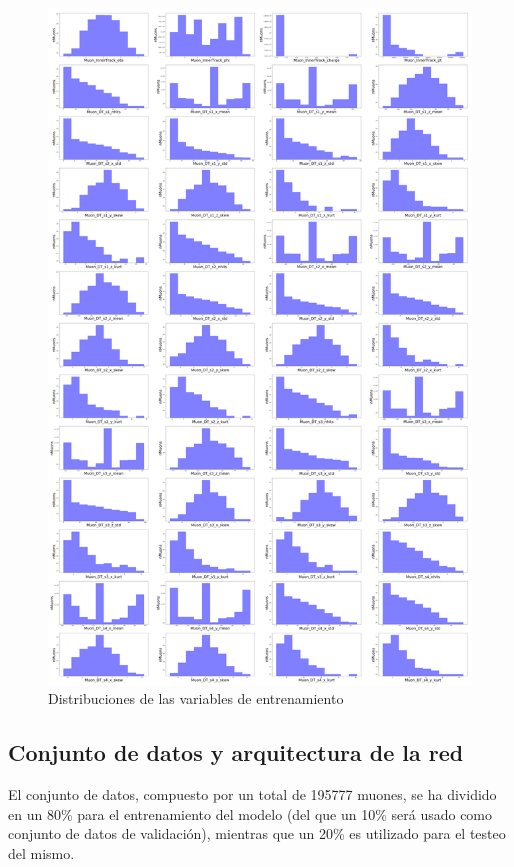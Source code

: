 \begin{figure}
\centering
\includegraphics[width=1.0\textwidth]{figures/Training_vars_2.png}
\caption{Distribuciones de las variables de entrenamiento}
\label{fig:train_vars}        
\end{figure}


\subsection{Conjunto de datos y arquitectura de la red}\label{sec:arch}

El conjunto de datos, compuesto por un total de 195777 muones, se ha dividido en un 80\% para el entrenamiento del modelo (del que un 10\% ser\'a usado como conjunto de datos de validaci\'on), mientras que un 20\% es utilizado para el testeo del mismo. \\

